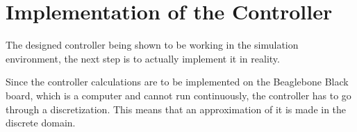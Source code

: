 \section{Implementation of the Controller}\label{impController}
The designed controller being shown to be working in the simulation environment, the next step is to actually implement it in reality.

Since the controller calculations are to be implemented on the Beaglebone Black board, which is a computer and cannot run continuously, the controller has to go through a discretization. This means that an approximation of it is made in the discrete domain.